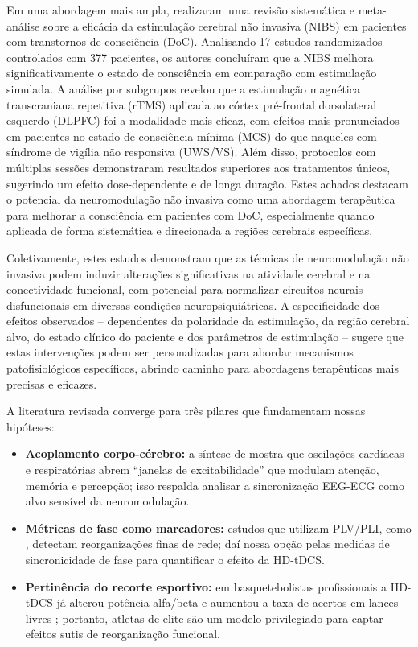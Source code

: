 Em uma abordagem mais ampla,  realizaram uma revisão sistemática e meta-análise sobre a eficácia da estimulação cerebral não invasiva (NIBS) em pacientes com transtornos de consciência (DoC). Analisando 17 estudos randomizados controlados com 377 pacientes, os autores concluíram que a NIBS melhora significativamente o estado de consciência em comparação com estimulação simulada. A análise por subgrupos revelou que a estimulação magnética transcraniana repetitiva (rTMS) aplicada ao córtex pré-frontal dorsolateral esquerdo (DLPFC) foi a modalidade mais eficaz, com efeitos mais pronunciados em pacientes no estado de consciência mínima (MCS) do que naqueles com síndrome de vigília não responsiva (UWS/VS). Além disso, protocolos com múltiplas sessões demonstraram resultados superiores aos tratamentos únicos, sugerindo um efeito dose-dependente e de longa duração. Estes achados destacam o potencial da neuromodulação não invasiva como uma abordagem terapêutica para melhorar a consciência em pacientes com DoC, especialmente quando aplicada de forma sistemática e direcionada a regiões cerebrais específicas.

Coletivamente, estes estudos demonstram que as técnicas de neuromodulação não invasiva podem induzir alterações significativas na atividade cerebral e na conectividade funcional, com potencial para normalizar circuitos neurais disfuncionais em diversas condições neuropsiquiátricas. A especificidade dos efeitos observados – dependentes da polaridade da estimulação, da região cerebral alvo, do estado clínico do paciente e dos parâmetros de estimulação – sugere que estas intervenções podem ser personalizadas para abordar mecanismos patofisiológicos específicos, abrindo caminho para abordagens terapêuticas mais precisas e eficazes.

A literatura revisada converge para três pilares que fundamentam nossas hipóteses:
\begin{itemize}
    \item \textbf{Acoplamento corpo-cérebro:} a síntese de \cite{criscuolo2022cognition} mostra que oscilações cardíacas e respiratórias abrem ``janelas de excitabilidade'' que modulam atenção, memória e percepção; isso respalda analisar a sincronização EEG-ECG como alvo sensível da neuromodulação.
    
    \item \textbf{Métricas de fase como marcadores:} estudos que utilizam PLV/PLI, como \cite{singh2024evaluating}, detectam reorganizações finas de rede; daí nossa opção pelas medidas de sincronicidade de fase para quantificar o efeito da HD-tDCS.
    
    \item \textbf{Pertinência do recorte esportivo:} em basquetebolistas profissionais a HD-tDCS já alterou potência alfa/beta e aumentou a taxa de acertos em lances livres \cite{moscaleski2022hdtdcs}; portanto, atletas de elite são um modelo privilegiado para captar efeitos sutis de reorganização funcional.
\end{itemize}

